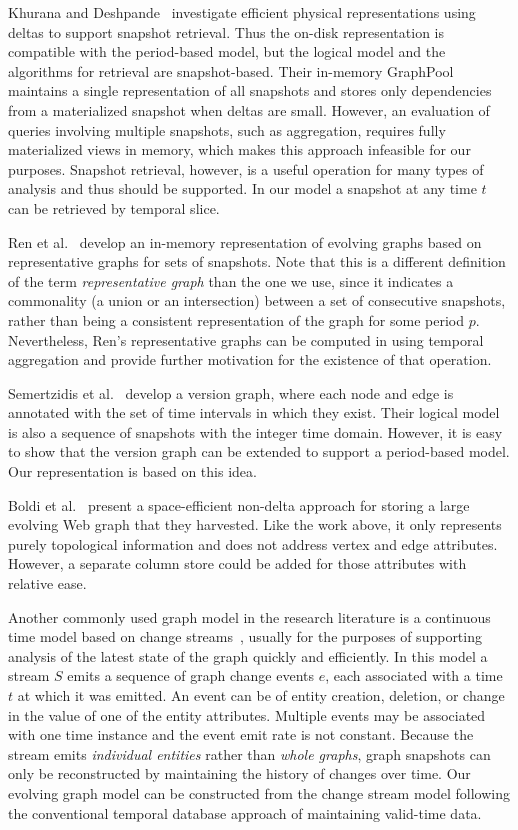 Khurana and Deshpande~\cite{Khurana2013} investigate efficient
physical representations using deltas to support snapshot retrieval.
Thus the on-disk representation is compatible with the period-based
model, but the logical model and the algorithms for retrieval are
snapshot-based.  Their in-memory GraphPool maintains a single
representation of all snapshots and stores only dependencies from a
materialized snapshot when deltas are small.  However, an evaluation
of queries involving multiple snapshots, such as aggregation, requires
fully materialized views in memory, which makes this approach
infeasible for our purposes.  Snapshot retrieval, however, is a useful
operation for many types of analysis and thus should be supported.  In
our model a snapshot at any time $t$ can be retrieved by temporal
slice.

Ren et al.~\cite{Ren2011} develop an in-memory representation of
evolving graphs based on representative graphs for sets of snapshots.
Note that this is a different definition of the term {\em
  representative graph} than the one we use, since it indicates a
commonality (a union or an intersection) between a set of consecutive
snapshots, rather than being a consistent representation of the graph
for some period $p$.  Nevertheless, Ren's representative graphs
can be computed in \ql using temporal aggregation and provide further
motivation for the existence of that operation.

Semertzidis et al.~\cite{Semertzidis2015} develop a version graph,
where each node and edge is annotated with the set of time intervals
in which they exist.  Their logical model is also a sequence of
snapshots with the integer time domain.  However, it is easy to show
that the version graph can be extended to support a period-based
model.  Our \og representation is based on this idea.

Boldi et al.~\cite{Boldi2008} present a space-efficient non-delta
approach for storing a large evolving Web graph that they harvested.
Like the work above, it only represents purely topological information
and does not address vertex and edge attributes.  However, a separate
column store could be added for those attributes with relative ease.

Another commonly used graph model in the research literature is a
continuous time model based on change
streams~\cite{Cheng2012,Ediger2012}, usually for the purposes of
supporting analysis of the latest state of the graph quickly and
efficiently.  In this model a stream $S$ emits a sequence of graph
change events $e$, each associated with a time $t$ at which it was
emitted.  An event can be of entity creation, deletion, or change in
the value of one of the entity attributes.  Multiple events may be
associated with one time instance and the event emit rate is not
constant.  Because the stream emits {\em individual entities} rather
than {\em whole graphs}, graph snapshots can only be reconstructed by
maintaining the history of changes over time.  Our evolving graph
model can be constructed from the change stream model following
the conventional temporal database approach of maintaining valid-time data.

